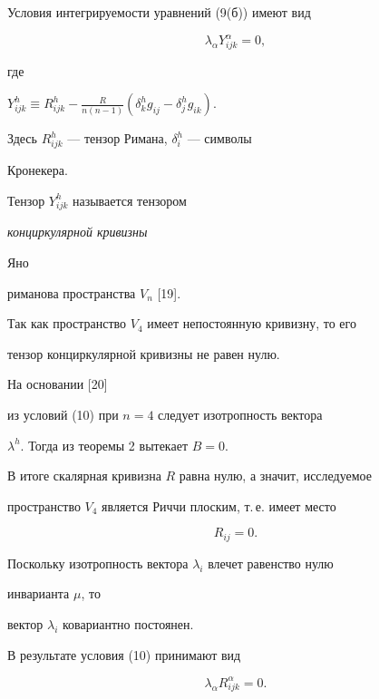 Условия интегрируемости уравнений (9(б)) имеют вид


\begin{equation}


\lambda_\alpha Y_{ijk}^\alpha =0,


\end{equation}


где


$Y_{ijk}^h\equiv R_{ijk}^h-\frac R{n(n-1)}(\delta_k^hg_{ij}-


\delta_j^hg_{ik})$. 


Здесь $R_{ijk}^h$ --- тензор Римана, $\delta_i^h$ --- символы


Кронекера. 





Тензор $Y_{ijk}^h$ называется тензором {\it конциркулярной кривизны


Яно} риманова пространства $V_n$ [19].


Так как пространство $V_4$ имеет непостоянную кривизну, то его


тензор конциркулярной кривизны не равен нулю.





На основании [20]


из условий (10) при $n=4$ следует изотропность вектора 


$\lambda ^h$. Тогда из теоремы 2 вытекает $B=0$. 


В итоге скалярная кривизна $R$ равна нулю, а значит, исследуемое


пространство $V_4$ является Риччи плоским, т.\,е. имеет место


\begin{equation}


R_{ij}=0.


\end{equation}





Поскольку изотропность вектора $\lambda_i$ влечет равенство нулю


инварианта $\mu $, то


вектор $\lambda_i$ ковариантно постоянен.


В результате условия (10) принимают вид


\begin{equation}


\lambda_\alpha R_{ijk}^\alpha =0.


\end{equation}





